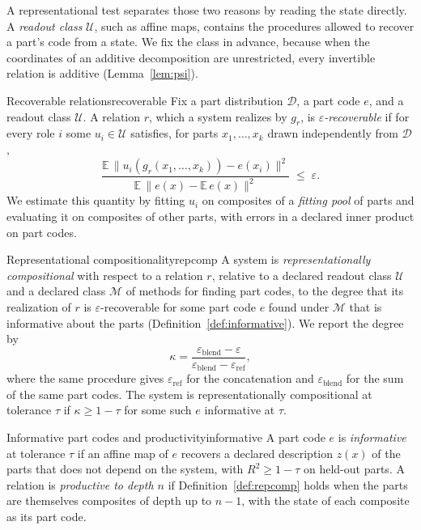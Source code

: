 \documentclass[10pt]{article}
\theoremstyle{plain}
\theoremstyle{remark}
\newcommand{\U}{\mathcal{U}}
\newcommand{\M}{\mathcal{M}}
\newcommand{\D}{\mathcal{D}}
\begin{document}
A representational test separates those two reasons by reading the state directly. A \emph{readout class} $\U$, such as affine maps, contains the procedures allowed to recover a part's code from a state. We fix the class in advance, because when the coordinates of an additive decomposition are unrestricted, every invertible relation is additive (Lemma~\ref{lem:psi}).

\begin{defbox}{Recoverable relations}{recoverable}
Fix a part distribution $\D$, a part code $e$, and a readout class $\U$. A relation $r$, which a system realizes by $g_r$, is \emph{$\varepsilon$-recoverable} if for every role $i$ some $u_i \in \U$ satisfies, for parts $x_1, \ldots, x_k$ drawn independently from $\D$,
\begin{equation}
  \frac{\mathbb{E}\,\lVert u_i(g_r(x_1,\ldots,x_k)) - e(x_i) \rVert^2}{\mathbb{E}\,\lVert e(x) - \mathbb{E}\,e(x) \rVert^2} \;\le\; \varepsilon .
  \label{eq:recover}
\end{equation}
We estimate this quantity by fitting $u_i$ on composites of a \emph{fitting pool} of parts and evaluating it on composites of other parts, with errors in a declared inner product on part codes.
\end{defbox}

\begin{defbox}{Representational compositionality}{repcomp}
A system is \emph{representationally compositional} with respect to a relation $r$, relative to a declared readout class $\U$ and a declared class $\M$ of methods for finding part codes, to the degree that its realization of $r$ is $\varepsilon$-recoverable for some part code $e$ found under $\M$ that is informative about the parts (Definition~\ref{def:informative}). We report the degree by
\begin{equation}
  \kappa = \frac{\varepsilon_{\mathrm{blend}} - \varepsilon}{\varepsilon_{\mathrm{blend}} - \varepsilon_{\mathrm{ref}}},
  \label{eq:kappa}
\end{equation}
where the same procedure gives $\varepsilon_{\mathrm{ref}}$ for the concatenation and $\varepsilon_{\mathrm{blend}}$ for the sum of the same part codes. The system is representationally compositional at tolerance $\tau$ if $\kappa \ge 1 - \tau$ for some such $e$ informative at $\tau$.
\end{defbox}

\begin{defbox}{Informative part codes and productivity}{informative}
A part code $e$ is \emph{informative} at tolerance $\tau$ if an affine map of $e$ recovers a declared description $z(x)$ of the parts that does not depend on the system, with $R^2 \ge 1 - \tau$ on held-out parts. A relation is \emph{productive to depth $n$} if Definition~\ref{def:repcomp} holds when the parts are themselves composites of depth up to $n - 1$, with the state of each composite as its part code.
\end{defbox}
\end{document}
